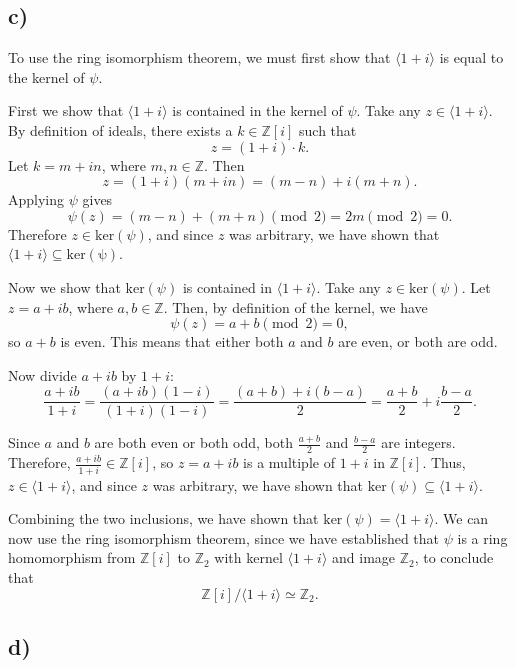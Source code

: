 \documentclass[a4paper,12pt]{article}
\begin{document}
\subsection*{c)}

To use the ring isomorphism theorem, we must first show that $\langle 1 + i\rangle $ is equal to the kernel of $\psi$.

First we show that $\langle 1 + i\rangle $ is contained in the kernel of $\psi$. Take any $z \in \langle 1 + i\rangle $. By definition of ideals, there exists a $k \in \mathbb{Z}[i]$ such that
\[z = (1 + i) \cdot k.
\]
Let $k = m + in$, where $m, n \in \mathbb{Z}$. Then
\[z = (1 + i)(m + in) = (m - n) + i(m + n).
\]
Applying $\psi$ gives
\[\psi(z) = (m - n) + (m + n) \pmod{2} = 2m \pmod{2} = 0.
\]
Therefore $z \in \mathrm{ker}(\psi)$, and since $z$ was arbitrary, we have shown that $\langle 1 + i\rangle  \subseteq \mathrm{ker(\psi)}$.

Now we show that $\mathrm{ker}(\psi)$ is contained in $\langle 1 + i\rangle $. Take any $z \in \mathrm{ker}(\psi)$. Let $z = a + ib$, where $a, b \in \mathbb{Z}$. Then, by definition of the kernel, we have
\[\psi(z) = a + b \pmod{2} = 0,
\]
so $a + b$ is even. This means that either both $a$ and $b$ are even, or both are odd.

Now divide $a + ib$ by $1 + i$:
\[
\frac{a + ib}{1 + i} = \frac{(a + ib)(1 - i)}{(1 + i)(1 - i)} = \frac{(a + b) + i(b - a)}{2} = \frac{a + b}{2} + i\frac{b - a}{2}.
\]

Since $a$ and $b$ are both even or both odd, both $\frac{a + b}{2}$ and $\frac{b - a}{2}$ are integers. Therefore, $\frac{a + ib}{1 + i} \in \mathbb{Z}[i]$, so $z = a + ib$ is a multiple of $1 + i$ in $\mathbb{Z}[i]$. Thus, $z \in \langle 1 + i\rangle $, and since $z$ was arbitrary, we have shown that $\mathrm{ker}(\psi) \subseteq \langle 1 + i\rangle $.

Combining the two inclusions, we have shown that $\mathrm{ker}(\psi) = \langle 1 + i\rangle $. We can now use the ring isomorphism theorem, since we have established that $\psi$ is a ring homomorphism from $\mathbb{Z}[i]$ to $\mathbb{Z}_2$ with kernel $\langle 1 + i\rangle $ and image $\mathbb{Z}_2$, to conclude that
\[\mathbb{Z}[i] / \langle 1 + i\rangle  \simeq \mathbb{Z}_2.
\]

\subsection*{d)}
\end{document}
